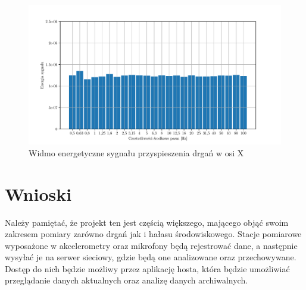 \documentclass[a4paper,12pt]{mwart}
\let\Oldsection\section
\renewcommand{\section}{\FloatBarrier\Oldsection}
\begin{document}
\begin{figure}[!tbh]
  \centering
  \includegraphics[width=\textwidth]{plots/power_x.pdf}
  \caption{Widmo energetyczne sygnału przyspieszenia drgań w osi X}
  \label{plot:power_x}
\end{figure}

\section{Wnioski}


Należy pamiętać, że projekt ten jest częścią większego, mającego objąć swoim
zakresem pomiary zarówno drgań jak i hałasu środowiskowego. Stacje pomiarowe
wyposażone w akcelerometry oraz mikrofony będą rejestrować dane, a następnie
wysyłać je na serwer sieciowy, gdzie będą one analizowane oraz przechowywane.
Dostęp do nich będzie możliwy przez aplikację hosta, która będzie umożliwiać
przeglądanie danych aktualnych oraz analizę danych archiwalnych.

\printbibliography[title=Bibliografia]
\end{document}
